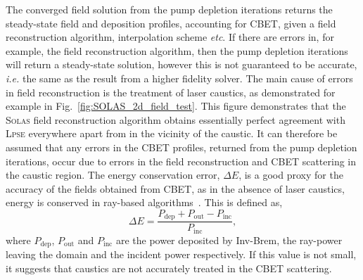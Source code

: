The converged field solution from the pump depletion iterations returns the steady-state field and deposition profiles, accounting for \ac{CBET}, given a field reconstruction algorithm, interpolation scheme \textit{etc}.
If there are errors in, for example, the field reconstruction algorithm, then the pump depletion iterations will return a steady-state solution, however this is not guaranteed to be accurate, \textit{i.e.} the same as the result from a higher fidelity solver.
The main cause of errors in field reconstruction is the treatment of laser caustics, as demonstrated for example in Fig.~\ref{fig:SOLAS_2d_field_test}.
This figure demonstrates that the \textsc{Solas} field reconstruction algorithm obtains essentially perfect agreement with \textsc{Lpse} everywhere apart from in the vicinity of the caustic.
It can therefore be assumed that any errors in the \ac{CBET} profiles, returned from the pump depletion iterations, occur due to errors in the field reconstruction and \ac{CBET} scattering in the caustic region.
The energy conservation error, $\Delta E$, is a good proxy for the accuracy of the fields obtained from \ac{CBET}, as in the absence of laser caustics, energy is conserved in ray-based algorithms~\cite{follett_validation_2022}.
This is defined as,
\begin{equation}
    \Delta E = \frac{ P_{\text{dep}} + P_{\text{out}} - P_{\text{inc}} }{ P_{\text{inc}} },
\end{equation}
where $P_{\text{dep}}$, $P_{\text{out}}$ and $P_{\text{inc}}$ are the power deposited by \ac{Inv-Brem}, the ray-power leaving the domain and the incident power respectively.
If this value is not small, it suggests that caustics are not accurately treated in the \ac{CBET} scattering.

